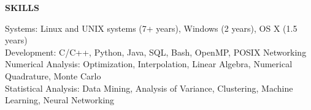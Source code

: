 \textbf{SKILLS} \\
\vspace{5pt}

Systems: Linux and UNIX systems (7+ years), Windows (2 years), OS X (1.5 years) \\
\vspace{2pt}
Development: C/C++, Python, Java, SQL, Bash, OpenMP, POSIX Networking \\
\vspace{2pt}
Numerical Analysis: Optimization, Interpolation, Linear Algebra, Numerical Quadrature, Monte Carlo \\
\vspace{2pt}
Statistical Analysis: Data Mining, Analysis of Variance, Clustering, Machine Learning, Neural Networking \\
\vspace{2pt}
